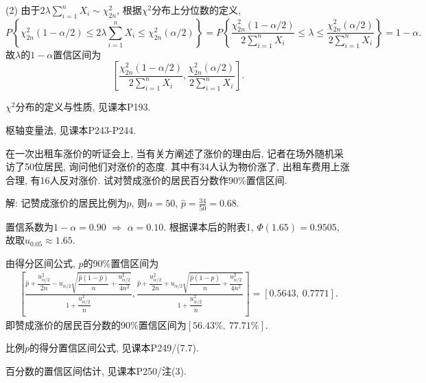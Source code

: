 \documentclass[standard]{ExBook}
\renewenvironment{shaded}{%
  \def\FrameCommand{\fboxsep=\FrameSep \colorbox{shadecolor}}%
  \MakeFramed{\advance\hsize-\width \FrameRestore}%
}{%
  \endMakeFramed
}
\begin{document}
\begin{qitems}
(2) 由于$2\lambda\sum_{i=1}^{n}X_i\sim\chi_{2n}^2$, 根据$\chi^2$分布上分位数的定义,
$$
P\left\{
\chi_{2n}^2(1-\alpha/2)
\leq
2\lambda\sum_{i=1}^{n}X_i
\leq
\chi_{2n}^2(\alpha/2)
\right\}
=
P\left\{
\frac{\chi_{2n}^2(1-\alpha/2)}
{2\sum\limits_{i=1}^{n}X_i}
\leq
\lambda
\leq
\frac{\chi_{2n}^2(\alpha/2)}
{2\sum\limits_{i=1}^{n}X_i}
\right\}
=
1-\alpha.
$$
故$\lambda$的$1-\alpha$置信区间为
$$
\left[
\frac{\chi_{2n}^2(1-\alpha/2)}
{2\sum\limits_{i=1}^{n}X_i},
\frac{\chi_{2n}^2(\alpha/2)}
{2\sum\limits_{i=1}^{n}X_i}
\right].
$$

\textcolor{themeColor}{\selectfont {} $\chi^2$分布的定义与性质, 见课本P193.}

\textcolor{themeColor}{\selectfont {} 枢轴变量法, 见课本P243-P244.}

\vspace{2.5cm-5em}

    \begin{bbox}
    \begin{shaded}
        \qitem
在一次出租车涨价的听证会上, 当有关方阐述了涨价的理由后, 记者在场外随机采访了50位居民, 询问他们对涨价的态度. 其中有34人认为物价涨了, 出租车费用上涨合理, 有16人反对涨价. 试对赞成涨价的居民百分数作90\%置信区间.
    \end{shaded}
    \end{bbox}

\vspace{\dimexpr2.5cm-5em\relax}

解: 记赞成涨价的居民比例为$p$, 则$
n=50$, $\widehat{p}=\frac{34}{50}=0.68$. 

置信系数为$1-\alpha=0.90$ $\Longrightarrow$ $\alpha=0.10$. 根据课本后的附表1, $\Phi(1.65)=0.9505$, 故取$u_{0.05}\approx1.65$.

由得分区间公式, $p$的90\%置信区间为
$$
\begin{aligned}
\left[
\frac{\widehat{p}+\dfrac{u_{\alpha/2}^2}{2n}
-u_{\alpha/2}\sqrt{\dfrac{\widehat{p}(1-\widehat{p})}{n}
+\dfrac{u_{\alpha/2}^2}{4n^2}}}
{1+\dfrac{u_{\alpha/2}^2}{n}},
\frac{\widehat{p}+\dfrac{u_{\alpha/2}^2}{2n}
+u_{\alpha/2}\sqrt{\dfrac{\widehat{p}(1-\widehat{p})}{n}
+\dfrac{u_{\alpha/2}^2}{4n^2}}}
{1+\dfrac{u_{\alpha/2}^2}{n}}
\right]
=
[0.5643,\ 0.7771].
\end{aligned}
$$
即赞成涨价的居民百分数的90\%置信区间为$[56.43\%,\ 77.71\%]$.

\textcolor{themeColor}{\selectfont {}
比例$p$的得分置信区间公式, 见课本P249/(7.7).}

\textcolor{themeColor}{\selectfont {}
百分数的置信区间估计, 见课本P250/注(3).}


\end{qitems}
\end{document}
